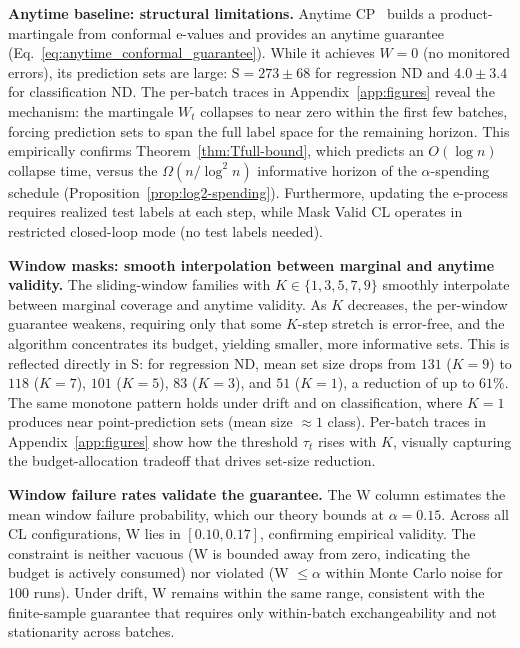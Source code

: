 \documentclass{uai2026} %
\newcommand{\1}{\mathbf{1}}
\begin{document}
\textbf{Anytime baseline: structural limitations.}
Anytime CP~\citep{gauthier2025values} builds a product-martingale from conformal e-values and provides an anytime guarantee (Eq.~\ref{eq:anytime_conformal_guarantee}).
While it achieves $W{=}0$ (no monitored errors), its prediction sets are large: $\mathrm{S}{=}273{\pm}68$ for regression ND and $4.0{\pm}3.4$ for classification ND.
The per-batch traces in Appendix~\ref{app:figures} reveal the mechanism: the martingale $W_t$ collapses to near zero within the first few batches, forcing prediction sets to span the full label space for the remaining horizon.
This empirically confirms Theorem~\ref{thm:Tfull-bound}, which predicts an $O(\log n)$ collapse time, versus the $\Omega(n/\log^2 n)$ informative horizon of the $\alpha$-spending schedule (Proposition~\ref{prop:log2-spending}).
Furthermore, updating the e-process requires realized test labels at each step, while Mask Valid CL operates in restricted closed-loop mode (no test labels needed).

\textbf{Window masks: smooth interpolation between marginal and anytime validity.}
The sliding-window families with $K \in \{1, 3, 5, 7, 9\}$ smoothly interpolate between marginal coverage and anytime validity.
As $K$ decreases, the per-window guarantee weakens, requiring only that some $K$-step stretch is error-free, and the algorithm concentrates its budget, yielding smaller, more informative sets.
This is reflected directly in S: for regression ND, mean set size drops from $131$ ($K{=}9$) to $118$ ($K{=}7$), $101$ ($K{=}5$), $83$ ($K{=}3$), and $51$ ($K{=}1$), a reduction of up to $61\%$.
The same monotone pattern holds under drift and on classification, where $K{=}1$ produces near point-prediction sets (mean size ${\approx}1$ class).
Per-batch traces in Appendix~\ref{app:figures} show how the threshold $\tau_t$ rises with $K$, visually capturing the budget-allocation tradeoff that drives set-size reduction.

\textbf{Window failure rates validate the guarantee.}
The W column estimates the mean window failure probability, which our theory bounds at $\alpha{=}0.15$.
Across all CL configurations, W lies in $[0.10, 0.17]$, confirming empirical validity.
The constraint is neither vacuous (W is bounded away from zero, indicating the budget is actively consumed) nor violated (W $\le \alpha$ within Monte Carlo noise for 100 runs).
Under drift, W remains within the same range, consistent with the finite-sample guarantee that requires only within-batch exchangeability and not stationarity across batches.
\end{document}
